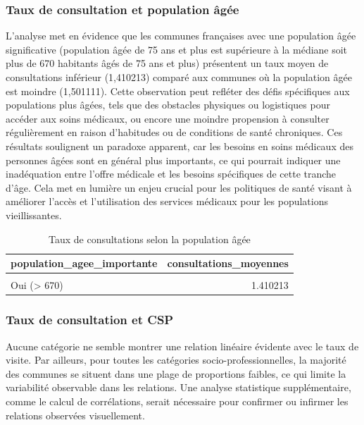 \documentclass[
]{article}
\begin{document}
\subsubsection{Taux de consultation et population
âgée}\label{taux-de-consultation-et-population-uxe2guxe9e}

L'analyse met en évidence que les communes françaises avec une
population âgée significative (population âgée de 75 ans et plus est
supérieure à la médiane soit plus de 670 habitants âgés de 75 ans et
plus) présentent un taux moyen de consultations inférieur (1,410213)
comparé aux communes où la population âgée est moindre (1,501111). Cette
observation peut refléter des défis spécifiques aux populations plus
âgées, tels que des obstacles physiques ou logistiques pour accéder aux
soins médicaux, ou encore une moindre propension à consulter
régulièrement en raison d'habitudes ou de conditions de santé
chroniques. Ces résultats soulignent un paradoxe apparent, car les
besoins en soins médicaux des personnes âgées sont en général plus
importants, ce qui pourrait indiquer une inadéquation entre l'offre
médicale et les besoins spécifiques de cette tranche d'âge. Cela met en
lumière un enjeu crucial pour les politiques de santé visant à améliorer
l'accès et l'utilisation des services médicaux pour les populations
vieillissantes.

\begin{table}[H]
\centering
\caption{\label{tab:unnamed-chunk-9}Taux de consultations selon la population âgée}
\centering
\begin{tabular}[t]{lr}
\toprule
population\_agee\_importante & consultations\_moyennes\\
\midrule
\cellcolor{gray!10}{Non (<= 670)} & \cellcolor{gray!10}{1.501111}\\
Oui (> 670) & 1.410213\\
\bottomrule
\end{tabular}
\end{table}

\subsubsection{Taux de consultation et
CSP}\label{taux-de-consultation-et-csp}

Aucune catégorie ne semble montrer une relation linéaire évidente avec
le taux de visite. Par ailleurs, pour toutes les catégories
socio-professionnelles, la majorité des communes se situent dans une
plage de proportions faibles, ce qui limite la variabilité observable
dans les relations. Une analyse statistique supplémentaire, comme le
calcul de corrélations, serait nécessaire pour confirmer ou infirmer les
relations observées visuellement.
\end{document}
